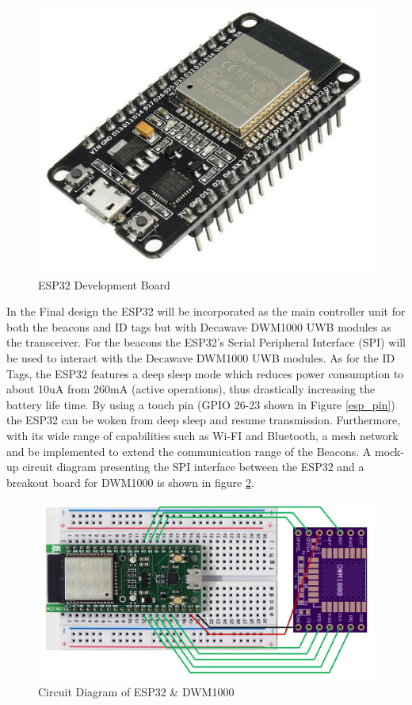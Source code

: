 \begin{figure}[H]
\centering
    \includegraphics[scale=0.25]{./images/esp.jpg}
    \caption{ESP32 Development Board}
    \label{esp}
\end{figure}


\pagebreak
In the Final design the ESP32 will be incorporated as the main controller unit for both the beacons and ID tags but with Decawave DWM1000 UWB modules as the transceiver. For the beacons the ESP32’s Serial Peripheral Interface (SPI) will be used to interact with the Decawave DWM1000 UWB modules. As for the ID Tags, the ESP32 features a deep sleep mode which reduces power consumption to about 10uA from 260mA (active operations), thus drastically increasing the battery life time. By using a touch pin (\Gls{GPIO} 26-23 shown in Figure \ref{esp_pin}) the ESP32 can be woken from deep sleep and resume transmission. Furthermore, with its wide range of capabilities such as Wi-FI and Bluetooth, a mesh network and be implemented to extend the communication range of the Beacons. A mock-up circuit diagram presenting the SPI interface between the ESP32 and a breakout board for DWM1000 is shown in figure \ref{eps_dwm_circuit}.

\medskip
\begin{figure}[H]
\centering
    \includegraphics[scale=0.5]{./images/eps_dwm_circuit.png}
    \caption{Circuit Diagram of ESP32 \& DWM1000}
    \label{eps_dwm_circuit}
\end{figure}

